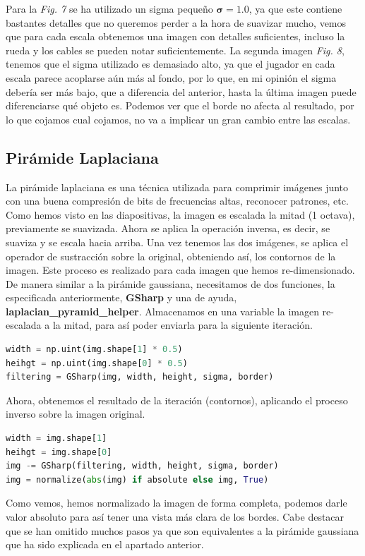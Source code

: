 \documentclass{article}
\begin{document}
Para la \textit{Fig. 7} se ha utilizado un sigma pequeño $\boldsymbol{\sigma} = 1.0$, ya que este contiene bastantes detalles que no queremos perder a la hora de suavizar mucho, vemos que para cada escala obtenemos una imagen con detalles suficientes, incluso la rueda y los cables se pueden notar suficientemente.
\newline
\newline
La segunda imagen \textit{Fig. 8}, tenemos que el sigma utilizado es demasiado alto, ya que el jugador en cada escala parece acoplarse aún más al fondo, por lo que, en mi opinión el sigma debería ser más bajo, que a diferencia del anterior, hasta la última imagen puede diferenciarse qué objeto es.
\newline
\newline
Podemos ver que el borde no afecta al resultado, por lo que cojamos cual cojamos, no va a implicar un gran cambio entre las escalas.

\subsection{Pirámide Laplaciana}
La pirámide laplaciana es una técnica utilizada para comprimir imágenes junto con una buena compresión de bits de frecuencias altas, reconocer patrones, etc. Como hemos visto en las diapositivas, la imagen es escalada la mitad (1 octava), previamente se suavizada. Ahora se aplica la operación inversa, es decir, se suaviza y se escala hacia arriba. Una vez tenemos las dos imágenes, se aplica el operador de sustracción sobre la original, obteniendo así, los contornos de la imagen. Este proceso es realizado para cada imagen que hemos re-dimensionado.
\newline
\newline
De manera similar a la pirámide gaussiana, necesitamos de dos funciones, la especificada anteriormente, \textbf{GSharp} y una de ayuda, \textbf{laplacian\_pyramid\_helper}. 
Almacenamos en una variable la imagen re-escalada a la mitad, para así poder enviarla para la siguiente iteración.
\begin{lstlisting}[language=Python]
width = np.uint(img.shape[1] * 0.5)
heihgt = np.uint(img.shape[0] * 0.5)
filtering = GSharp(img, width, height, sigma, border)
\end{lstlisting}
Ahora, obtenemos el resultado de la iteración (contornos), aplicando el proceso inverso sobre la imagen original.
\begin{lstlisting}[language=Python]
width = img.shape[1]
heihgt = img.shape[0]
img -= GSharp(filtering, width, height, sigma, border)
img = normalize(abs(img) if absolute else img, True)
\end{lstlisting}
Como vemos, hemos normalizado la imagen de forma completa, podemos darle valor absoluto para así tener una vista más clara de los bordes.
\newline
\newline
Cabe destacar que se han omitido muchos pasos ya que son equivalentes a la pirámide gaussiana que ha sido explicada en el apartado anterior.
\end{document}
